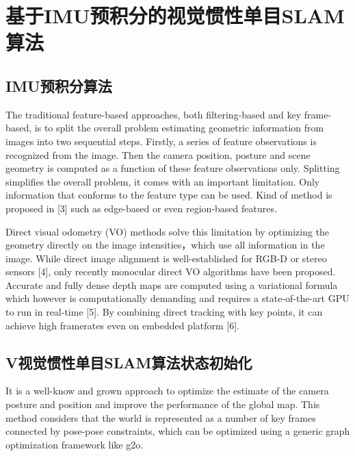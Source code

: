 
\chapter{基于IMU预积分的视觉惯性单目SLAM算法}
\label{chap:VISLAM}


\section{IMU预积分算法}
The traditional feature-based approaches, both filtering-based and key frame-based, is to split the overall problem estimating geometric information from images into two sequential steps. Firstly, a series of feature observations is recognized from the image. Then the camera position, posture and scene geometry is computed as a function of these feature observations only. Splitting simplifies the overall problem, it comes with an important limitation. Only information that conforms to the feature type can be used. Kind of method is proposed in [3] such as edge-based or even region-based features.

Direct visual odometry (VO) methods solve this limitation by optimizing the geometry directly on the image intensities，which use all information in the image. While direct image alignment is well-established for RGB-D or stereo sensors [4], only recently monocular direct VO algorithms have been proposed. Accurate and fully dense depth maps are computed using a variational formula which however is computationally demanding and requires a state-of-the-art GPU to run in real-time [5]. By combining direct tracking with key points, it can achieve high framerates even on embedded platform [6].


\section{V视觉惯性单目SLAM算法状态初始化}
It is a well-know and grown approach to optimize the estimate of the camera posture and position and improve the performance of the global map. This method considers that the world is represented as a number of key frames connected by pose-pose constraints, which can be optimized using a generic graph optimization framework like g2o.


